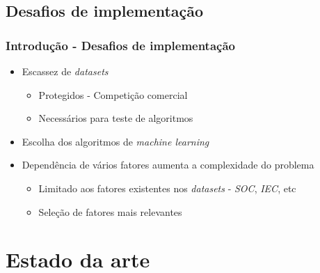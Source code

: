 \documentclass{beamer}
\begin{document}
\subsection[Desafios de implementação]{Desafios de implementação}
\begin{frame}
\frametitle{Introdução - Desafios de implementação}


\begin{itemize}
	\item Escassez de \textit{datasets} 
		  \begin{itemize}
				\item Protegidos - Competição comercial
			  	\item Necessários para teste de algoritmos
		  \end{itemize}
	\item Escolha dos algoritmos de \textit{machine learning}
	\item Dependência de vários fatores aumenta a complexidade do problema
	 \begin{itemize}
			\item Limitado aos fatores existentes nos \textit{datasets} - 
			\textit{SOC}, \textit{IEC}, etc
			\item Seleção de fatores mais relevantes%
		  \end{itemize}
\end{itemize}

\end{frame}

\section[Estado da arte]{Estado da arte}
\end{document}
